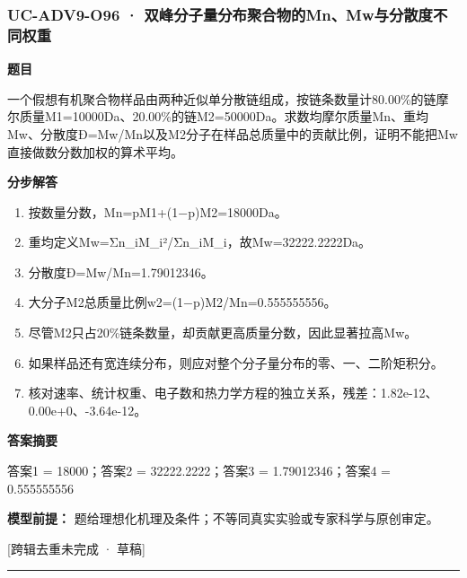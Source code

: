 \documentclass[UTF8,11pt,a4paper]{ctexart}
\begin{document}
\subsubsection*{UC-ADV9-O96 · 双峰分子量分布聚合物的Mn、Mw与分散度不同权重}
\noindent\textbf{题目}\par
一个假想有机聚合物样品由两种近似单分散链组成，按链条数量计80.00\%的链摩尔质量M1=10000Da、20.00\%的链M2=50000Da。求数均摩尔质量Mn、重均Mw、分散度Đ=Mw/Mn以及M2分子在样品总质量中的贡献比例，证明不能把Mw直接做数分数加权的算术平均。\par
\medskip\noindent\textbf{分步解答}
\begin{enumerate}
\item 按数量分数，Mn=pM1+(1−p)M2=18000Da。
\item 重均定义Mw=Σn\_iM\_i²/Σn\_iM\_i，故Mw=32222.2222Da。
\item 分散度Đ=Mw/Mn=1.79012346。
\item 大分子M2总质量比例w2=(1−p)M2/Mn=0.555555556。
\item 尽管M2只占20\%链条数量，却贡献更高质量分数，因此显著拉高Mw。
\item 如果样品还有宽连续分布，则应对整个分子量分布的零、一、二阶矩积分。
\item 核对速率、统计权重、电子数和热力学方程的独立关系，残差：1.82e-12、0.00e+0、-3.64e-12。
\end{enumerate}
\noindent\textbf{答案摘要}\par
答案1 = 18000；答案2 = 32222.2222；答案3 = 1.79012346；答案4 = 0.555555556\par
\noindent\textbf{模型前提：}
题给理想化机理及条件；不等同真实实验或专家科学与原创审定。\par
\noindent\textcolor{red!65!black}{[跨辑去重未完成 · 草稿]} \par
\medskip\hrule\medskip
{}
\end{document}
